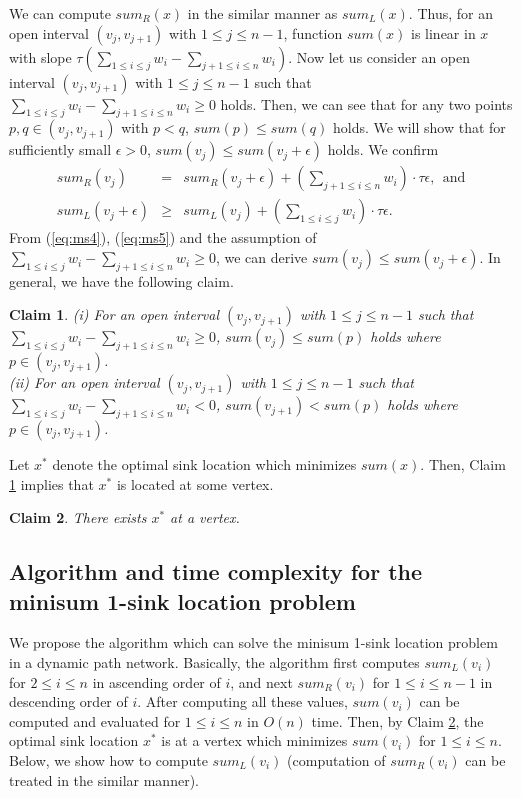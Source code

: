 \documentclass[a4paper]{llncs}
\newtheorem{clm}{Claim}
\begin{document}
We can compute $sum_R(x)$ in the similar manner as $sum_L(x)$.
Thus, for an open interval $(v_j, v_{j+1})$ with $1 \le j \le n-1$, function $sum(x)$ is linear in $x$ with slope $\tau(\sum_{1 \le i \le j} w_i - \sum_{j+1 \le i \le n} w_i)$.
Now let us consider an open interval $(v_j, v_{j+1})$ with $1 \le j \le n-1$ such that $\sum_{1 \le i \le j} w_i - \sum_{j+1 \le i \le n} w_i \ge 0$ holds.
Then, we can see that for any two points $p, q \in (v_j, v_{j+1})$ with $p < q$, $sum(p) \le sum(q)$ holds.
We will show that for sufficiently small $\epsilon > 0$, $sum(v_j) \le sum(v_j + \epsilon)$ holds.
We confirm
\begin{eqnarray}
sum_R(v_j)	&=&	sum_R(v_j + \epsilon) + \left( \sum_{j+1 \le i \le n} w_i \right) \cdot \tau \epsilon, \ \ \mbox{and} \label{eq:ms4} \\
sum_L(v_j + \epsilon)	&\ge&	sum_L(v_j) + \left( \sum_{1 \le i \le j} w_i \right) \cdot \tau \epsilon. \label{eq:ms5}
\end{eqnarray}
From (\ref{eq:ms4}), (\ref{eq:ms5}) and the assumption of $\sum_{1 \le i \le j} w_i - \sum_{j+1 \le i \le n} w_i \ge 0$, 
we can derive $sum(v_j) \le sum(v_j + \epsilon)$.
In general, we have the following claim.
\begin{clm}
{\rm (i)} For an open interval $(v_j, v_{j+1})$ with $1 \le j \le n-1$ such that $\sum_{1 \le i \le j} w_i - \sum_{j+1 \le i \le n} w_i \ge 0$,
$sum(v_j) \le sum(p)$ holds where $p \in (v_j, v_{j+1})$. \\
{\rm (ii)} For an open interval $(v_j, v_{j+1})$ with $1 \le j \le n-1$ such that $\sum_{1 \le i \le j} w_i - \sum_{j+1 \le i \le n} w_i < 0$,
$sum(v_{j+1}) < sum(p)$ holds where $p \in (v_j, v_{j+1})$. 
\label{clm:ms1}
\end{clm}
Let $x^*$ denote the optimal sink location which minimizes $sum(x)$.
Then, Claim \ref{clm:ms1} implies that $x^*$ is located at some vertex.
\begin{clm}
There exists $x^*$ at a vertex.
\label{clm:ms2}
\end{clm}


\subsection{Algorithm and time complexity for the minisum 1-sink location problem}
We propose the algorithm which can solve the minisum 1-sink location problem in a dynamic path network.
Basically, the algorithm first computes $sum_L(v_i)$ for $2 \le i \le n$ in ascending order of $i$, and next $sum_R(v_i)$ for $1 \le i \le n-1$ in descending order of $i$.
After computing all these values, $sum(v_i)$ can be computed and evaluated for $1 \le i \le n$ in $O(n)$ time.
Then, by Claim \ref{clm:ms2}, the optimal sink location $x^*$ is at a vertex which minimizes $sum(v_i)$ for $1 \le i \le n$.
Below, we show how to compute $sum_L(v_i)$ (computation of $sum_R(v_i)$ can be treated in the similar manner).
\end{document}
